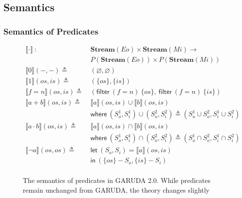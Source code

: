 \documentclass[12pt, letterpaper]{article}
\let\emptyset\varnothing
\newcommand\interp[1]{\llbracket #1 \rrbracket}
\def \sysname {\textsc{GARUDA 2.0}\xspace}
\def \oldname {\textsc{GARUDA}\xspace}
\begin{document}
    \clearpage
    \subsection{Semantics}\label{sec:spec:sem}
      \subsubsection{Semantics of Predicates}\label{sec:spec:sem:pred}
    
        \begin{figure}
          \centering
          \begin{align*}
            \interp{ \cdot }\ 
              :\ \ &
              \mathbf{Stream}(Eo)\times \mathbf{Stream}(Mi) \rightarrow \\
              & P(\mathbf{Stream}(Eo))\times P(\mathbf{Stream}(Mi)) 
              \\
            \interp{ 0 }(-, -)
              \triangleq\ &
              (\emptyset , \emptyset)
              \\ %
            \interp{ 1 }(\mathit{os}, \mathit{is})
              \triangleq\ &
              (\{\mathit{os}\},\{\mathit{is}\})
              \\
            \interp{ f=n }(\mathit{os}, \mathit{is})
              \triangleq\ &
              (\mathsf{filter}\ (f=n)\ \{\mathit{os}\},\
               \mathsf{filter}\ (f=n)\ \{\mathit{is}\}) 
              \\
            \interp{ a + b }(\mathit{os}, \mathit{is})
              \triangleq\ &
              \interp { a }(\mathit{os}, \mathit{is})\cup
              \interp { b }(\mathit{os}, \mathit{is}) \\
              &\mathsf{where}\ (S_o^1, S_i^1)\cup (S_o^2, S_i^2)\triangleq
                (S_o^1\cup S_o^2, S_i^1\cup S_i^2)\\
            \interp { a \cdot b }(\mathit{os}, \mathit{is})
              \triangleq\ &
              \interp { a }(\mathit{os}, \mathit{is})\cap
              \interp { b }(\mathit{os}, \mathit{is}) \\
              &\mathsf{where}\ (S_o^1, S_i^1)\cap (S_o^2, S_i^2)\triangleq
                (S_o^1\cap S_o^2, S_i^1\cap S_i^2)\\
            \interp { \neg a }(\mathit{os}, \mathit{os})
              \triangleq\ &
              \mathsf{let}\ (S_o, S_i) = \interp {a}(\mathit{os}, \mathit{is}) \\
              &\mathsf{in}\ (\{\mathit{os}\} - S_o, \{\mathit{is}\} - S_i)
              \\
          \end{align*}
          \caption{The semantics of predicates in \sysname.  While predicates remain unchanged from \oldname, the theory changes slightly}
          \label{fig:garuda:sem:pol}
        \end{figure}
\end{document}
